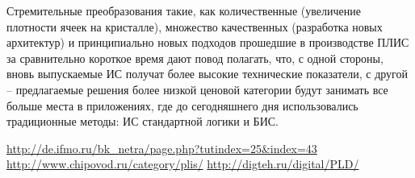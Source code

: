 Стремительные преобразования такие, как количественные (увеличение плотности
ячеек на кристалле), множество качественных (разработка новых архитектур) и
принципиально новых подходов прошедшие в производстве ПЛИС за
сравнительно короткое время дают повод полагать, что, с одной стороны, вновь
выпускаемые ИС получат более высокие технические показатели, с другой --
предлагаемые решения более низкой ценовой категории будут занимать все больше
места в приложениях, где до сегодняшнего дня использовались традиционные
методы: ИС стандартной логики и БИС.

\vspace*{2em} %
\renewcommand{\bibname}{Список источников}

\begin{thebibliography}{9} 
     \href{http://de.ifmo.ru/bk_netra/page.php?tutindex=25&index=43}
    {http://de.ifmo.ru/bk\_netra/page.php?tutindex=25\&index=43}
     \href{http://www.chipovod.ru/category/plis/}
    {http://www.chipovod.ru/category/plis/}
     \href{http://digteh.ru/digital/PLD/}
    {http://digteh.ru/digital/PLD/}
\end{thebibliography}